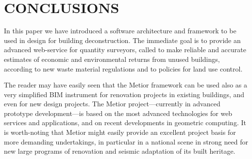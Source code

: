 \section{\uppercase{Conclusions}}
\label{sec:conclusion}

\noindent
In this paper we have introduced a software architecture and framework to be used in  design for building deconstruction. The immediate goal is to provide an advanced web-service for quantity surveyors, called  to make reliable and accurate estimates of economic and environmental returns from unused buildings, according to new waste material regulations and to policies for land use control.

The reader may have easily seen that the Metior framework can be used also as a very simplified BIM instrument for renovation projects in existing buildings, and even for new design projects.  The Metior project---currently in advanced prototype development---is based on the most advanced technologies for web services and applications, and on recent developments in geometric computing. 
It is worth-noting that Metior might easily provide an excellent project basis for more demanding undertakings, in particular in a national scene in strong need for new large programs of renovation and seismic adaptation of its built heritage.
